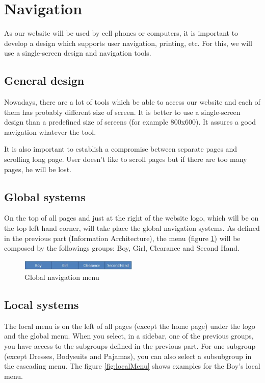 \section{Navigation}

As our website will be used by cell phones or computers, it is important to develop a design which supports user navigation, printing, etc. For this, we will use a single-screen design and navigation tools.

\subsection{General design}

Nowadays, there are a lot of tools which be able to access our website and each of them has probably different size of screen. It is better to use a single-screen design than a predefined size of screens (for example 800x600). It assures a good navigation whatever the tool. 

It is also important to establish a compromise between separate pages and scrolling long page. User doesn't like to scroll pages but if there are too many pages, he will be lost.


\subsection{Global systems}

On the top of all pages and just at the right of the website logo, which will be on the top left hand corner, will take place the global navigation systems. As defined in the previous part (Information Architecture), the menu (figure \ref{fig:globalMenu}) will be composed by the followings groups: Boy, Girl, Clearance and Second Hand.

\begin{figure}[h!]
  \centering  
  \includegraphics[width=0.5\textwidth]{globalMenu.jpg}                
  \caption{Global navigation menu}
  \label{fig:globalMenu}
\end{figure}


\subsection{Local systems}
The local menu is on the left of all pages (except the home page) under the logo and the global menu. When you select, in a sidebar, one of the previous groups, you have access to the subgroups defined in the previous part. For one subgroup (except Dresses, Bodysuits and Pajamas), you can also select a subsubgroup in the cascading menu. The figure \ref{fig:localMenu} shows examples for the Boy's local menu.

